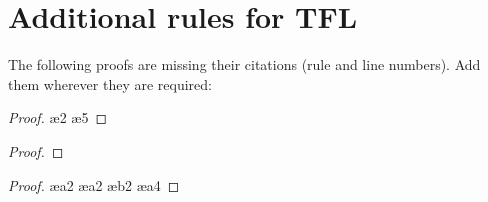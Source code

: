 \chapter{Additional rules for TFL}\setcounter{ProbPart}{0}
\problempart
\label{pr.justifyTFLproof}
The following proofs are missing their citations (rule and line numbers). Add them wherever they are required:
\begin{multicols}{2}
\begin{proof}
\ae{2}
\ae{5}
\end{proof}
\vfill
\begin{proof}
\open
\close
{}
\end{proof}
\columnbreak
\begin{proof}
\open
	\ae{a2}
	\ae{a2}
		\open
		\ae{b2}
	\close
	\ae{a4}
\close
{}
\end{proof}
\end{multicols}

